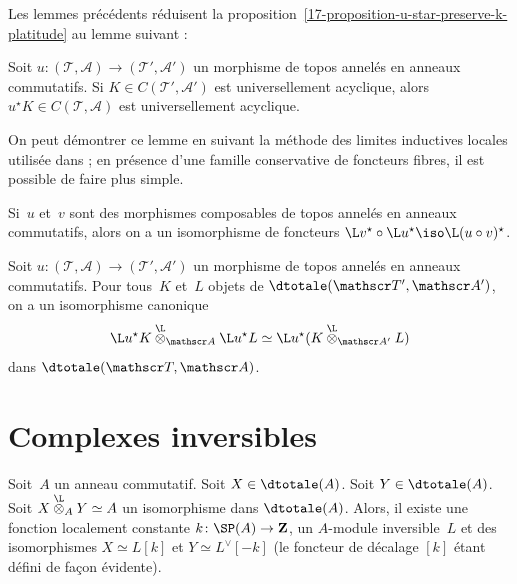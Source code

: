 \documentclass[10pt]{../fichiers-configuration-latex/smfart}
\begin{document}
\bigskip

Les lemmes précédents réduisent la
proposition~\ref{17-proposition-u-star-preserve-k-platitude} au lemme suivant :

\begin{lemme3}
Soit $u\colon (\mathscr T,\mathscr A)\to (\mathscr T',\mathscr A')$ un
morphisme de topos annelés en anneaux commutatifs. Si $K\in
C(\mathscr T',\mathscr A')$ est universellement acyclique, alors
$u^\star K\in C(\mathscr T,\mathscr A)$ est universellement acyclique.
\end{lemme3}

On peut démontrer ce lemme en suivant la méthode des limites inductives
locales utilisée dans  ; en présence d'une famille
conservative de foncteurs fibres, il est possible de faire plus simple.

\begin{corollaire3}
Si $u$ et $v$ sont des morphismes composables de topos annelés en anneaux
commutatifs, alors on a un isomorphisme de foncteurs
$\L v^\star\circ \L u^\star\iso \L (u\circ v)^\star$.
\end{corollaire3}

\begin{corollaire3}
Soit $u\colon (\mathscr T,\mathscr A)\to (\mathscr T',\mathscr A')$ un
morphisme de topos annelés en anneaux commutatifs.
Pour tous $K$ et $L$ objets de
$\dtotale(\mathscr T',\mathscr A')$, on a un isomorphisme canonique 
\[\L u^\star K\overset{\L}\otimes_{\mathscr A}\L u^\star
L\simeq \L u^\star (K\overset{\L}\otimes_{\mathscr A'}L)\]
dans $\dtotale(\mathscr T,\mathscr A)$.
\end{corollaire3}

\section{Complexes inversibles}%

\begin{proposition}\label{17-proposition-objets-inversibles-d-a}
Soit $A$ un anneau commutatif. Soit $X\in \dtotale(A)$. Soit $Y\in
\dtotale(A)$. Soit $X\overset{\L}{\otimes}_AY\simeq A$ un isomorphisme
dans $\dtotale(A)$. Alors, il existe une fonction localement constante
$k\colon \SP(A)\to \mathbf{Z}$, un $A$-module inversible $L$ et des
isomorphismes $X\simeq L[k]$ et $Y\simeq L^\vee [-k]$ (le foncteur de
décalage $[k]$ étant défini de façon évidente).
\end{proposition}
\end{document}
